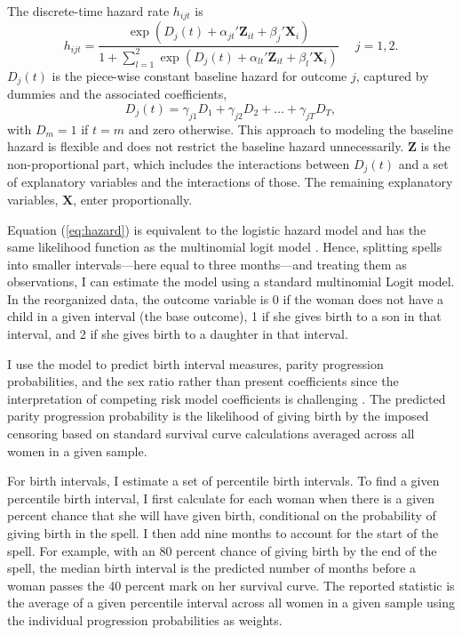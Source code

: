 \documentclass[12pt,letterpaper]{article}
\begin{document}
The discrete-time hazard rate $h_{ijt}$ is 
\begin{equation}
 h_{ijt} = \frac{\exp(D_j(t) + \alpha_{jt}'\mathbf{Z}_{it} + \beta_j'\mathbf{X}_{i})} 
 {1 + \sum_{l=1}^2 \exp(D_j(t) + \alpha_{lt}'\mathbf{Z}_{it} + \beta_l'\mathbf{X}_{i})} \: \: \; \; \;  j = 1,2.
 \label{eq:hazard}
\end{equation}
$D_{j}(t)$ is the piece-wise constant baseline hazard for outcome $j$, captured
by dummies and the associated coefficients,
\begin{equation}
D_j(t) = \gamma_{j1} D_1 + \gamma_{j2} D_2 + \ldots + \gamma_{jT} D_T,
\end{equation}
with $D_m = 1$ if $t=m$ and zero otherwise.
This approach to modeling the baseline hazard is flexible and does not restrict the 
baseline hazard unnecessarily.
$\mathbf{Z}$ is the non-proportional part, which includes the interactions between 
$D_j(t)$ and a set of explanatory variables and the interactions of those.
The remaining explanatory variables, $\mathbf{X}$, enter proportionally.




Equation (\ref{eq:hazard}) is equivalent to the logistic hazard model and has the same 
likelihood function as the multinomial logit model \citep{allison82,jenkins95}.
Hence, splitting spells into smaller intervals---here equal to three months---and 
treating them as observations, I can estimate the model using a standard multinomial 
Logit model. 
In the reorganized data, the outcome variable is 0 if the woman does not have a child 
in a given interval (the base outcome), 1 if she gives birth to a son in that interval, 
and 2 if she gives birth to a daughter in that interval.

I use the model to predict birth interval measures, parity progression probabilities, 
and the sex ratio rather than present coefficients since the interpretation 
of competing risk model coefficients is challenging \citep{thomas96}.
The predicted parity progression probability is the likelihood of giving birth by the
imposed censoring based on standard survival curve calculations averaged across all
women in a given sample.

For birth intervals, I estimate a set of percentile birth intervals.
To find a given percentile birth interval, I first calculate for each woman when there is 
a given percent chance that she will have given birth, conditional on the probability of 
giving birth in the spell.
I then add nine months to account for the start of the spell. 
For example, with an 80 percent chance of giving birth by the end of the spell, the median birth 
interval is the predicted number of months before a woman passes the 40 percent mark on her 
survival curve. 
The reported statistic is the average of a given percentile interval across all women in 
a given sample using the individual progression probabilities as weights.
\end{document}
